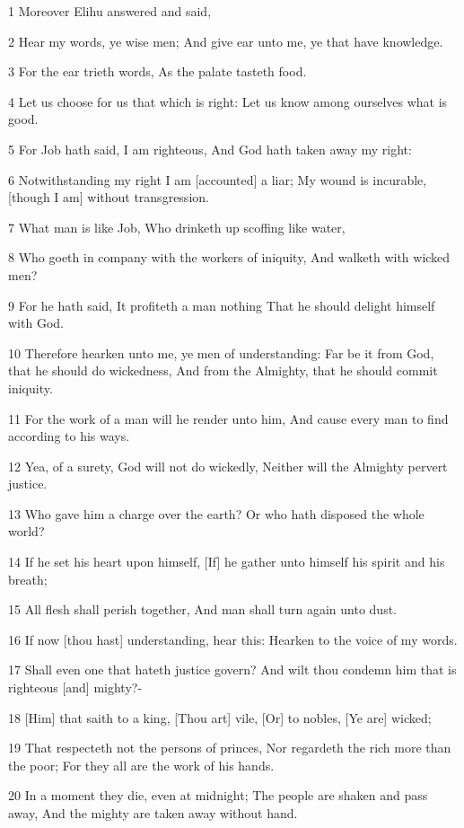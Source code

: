 \par 1 Moreover Elihu answered and said,
\par 2 Hear my words, ye wise men; And give ear unto me, ye that have knowledge.
\par 3 For the ear trieth words, As the palate tasteth food.
\par 4 Let us choose for us that which is right: Let us know among ourselves what is good.
\par 5 For Job hath said, I am righteous, And God hath taken away my right:
\par 6 Notwithstanding my right I am [accounted] a liar; My wound is incurable, [though I am] without transgression.
\par 7 What man is like Job, Who drinketh up scoffing like water,
\par 8 Who goeth in company with the workers of iniquity, And walketh with wicked men?
\par 9 For he hath said, It profiteth a man nothing That he should delight himself with God.
\par 10 Therefore hearken unto me, ye men of understanding: Far be it from God, that he should do wickedness, And from the Almighty, that he should commit iniquity.
\par 11 For the work of a man will he render unto him, And cause every man to find according to his ways.
\par 12 Yea, of a surety, God will not do wickedly, Neither will the Almighty pervert justice.
\par 13 Who gave him a charge over the earth? Or who hath disposed the whole world?
\par 14 If he set his heart upon himself, [If] he gather unto himself his spirit and his breath;
\par 15 All flesh shall perish together, And man shall turn again unto dust.
\par 16 If now [thou hast] understanding, hear this: Hearken to the voice of my words.
\par 17 Shall even one that hateth justice govern? And wilt thou condemn him that is righteous [and] mighty?-
\par 18 [Him] that saith to a king, [Thou art] vile, [Or] to nobles, [Ye are] wicked;
\par 19 That respecteth not the persons of princes, Nor regardeth the rich more than the poor; For they all are the work of his hands.
\par 20 In a moment they die, even at midnight; The people are shaken and pass away, And the mighty are taken away without hand.

